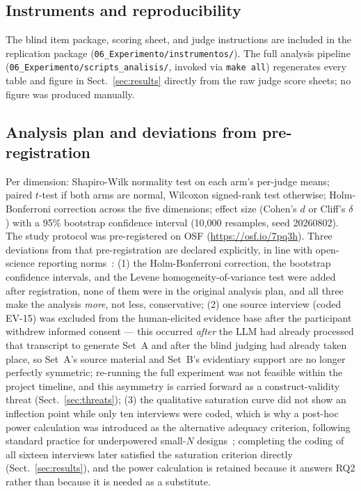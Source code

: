 \documentclass{llncs}
\begin{document}
\subsection{Instruments and reproducibility}
The blind item package, scoring sheet, and judge instructions are included in the
replication package (\texttt{06\_Experimento/instrumentos/}). The full analysis
pipeline (\texttt{06\_Experimento/scripts\_analisis/}, invoked via \texttt{make all})
regenerates every table and figure in Sect.~\ref{sec:results} directly from the raw
judge score sheets; no figure was produced manually.

\subsection{Analysis plan and deviations from pre-registration}
\label{sec:deviations}
Per dimension: Shapiro-Wilk normality test on each arm's per-judge means; paired
$t$-test if both arms are normal, Wilcoxon signed-rank test otherwise; Holm-Bonferroni
correction across the five dimensions; effect size (Cohen's $d$ or Cliff's $\delta$)
with a 95\% bootstrap confidence interval (10{,}000 resamples, seed 20260802). The
study protocol was pre-registered on OSF (\url{https://osf.io/7pq3h}). Three deviations
from that pre-registration are declared explicitly, in line with open-science
reporting norms~\cite{nosek2018preregistration}: (1) the Holm-Bonferroni correction,
the bootstrap confidence intervals, and the Levene homogeneity-of-variance test were
added after registration, none of them were in the original analysis plan, and all
three make the analysis \emph{more}, not less, conservative; (2) one source interview
(coded EV-15) was excluded from the human-elicited evidence base after the participant
withdrew informed consent --- this occurred \emph{after} the LLM had already processed
that transcript to generate Set~A and after the blind judging had already taken place,
so Set~A's source material and Set~B's evidentiary support are no longer perfectly
symmetric; re-running the full experiment was not feasible within the project timeline,
and this asymmetry is carried forward as a construct-validity threat
(Sect.~\ref{sec:threats}); (3) the qualitative saturation curve did not show an inflection
point while only ten interviews were coded, which is why a post-hoc power calculation was
introduced as the alternative adequacy criterion, following standard practice for
underpowered small-$N$ designs~\cite{molleri2020empirically}; completing the coding of all
sixteen interviews later satisfied the saturation criterion directly
(Sect.~\ref{sec:results}), and the power calculation is retained because it answers RQ2
rather than because it is needed as a substitute.
\end{document}
